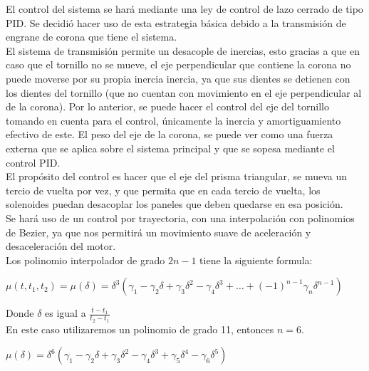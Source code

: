 
El control del sistema se hará mediante una ley de control de lazo cerrado de tipo PID. Se decidió hacer uso de esta estrategia básica debido a la transmisión de engrane de corona que tiene el sistema. \\
El sistema de transmisión permite un desacople de inercias, esto gracias a que en caso que el tornillo no se mueve, el eje perpendicular que contiene la corona no puede moverse por su propia inercia inercia, ya que sus dientes se detienen con los dientes del tornillo (que no cuentan con movimiento en el eje perpendicular al de la corona). Por lo anterior, se puede hacer el control del eje del tornillo tomando en cuenta para el control, únicamente la inercia y amortiguamiento efectivo de este. El peso del eje de la corona, se puede ver como una fuerza externa que se aplica sobre el sistema principal y que se sopesa mediante el control PID. \\
El propósito del control es hacer que el eje del prisma triangular, se mueva un tercio de vuelta por vez, y que permita que en cada tercio de vuelta, los solenoides puedan desacoplar los paneles que deben quedarse en esa posición. \\
Se hará uso de un control por trayectoria, con una interpolación con polinomios de Bezier, ya que nos permitirá un movimiento suave de aceleración y desaceleración del motor. \\
Los polinomio interpolador de grado $2n-1$ tiene la siguiente formula:

$\mu(t, t_1, t_2) = \mu(\delta) = \delta^{3}\left(\gamma_1 - \gamma_2\delta + \gamma_3\delta^{2} - \gamma_4\delta^{3} + \dots + \left(-1 \right)^{n-1}\gamma_n\delta^{n-1}  \right)$

Donde $\delta$ es igual a $\frac{t - t_1}{t_2 - t_1}$ \\
En este caso utilizaremos un polinomio de grado 11, entonces $n = 6$.

$\mu(\delta) = \delta^{6}\left(\gamma_1 - \gamma_2\delta + \gamma_3\delta^{2} - \gamma_4\delta^{3}+ \gamma_5\delta^{4} - \gamma_6\delta^{5} \right)$

